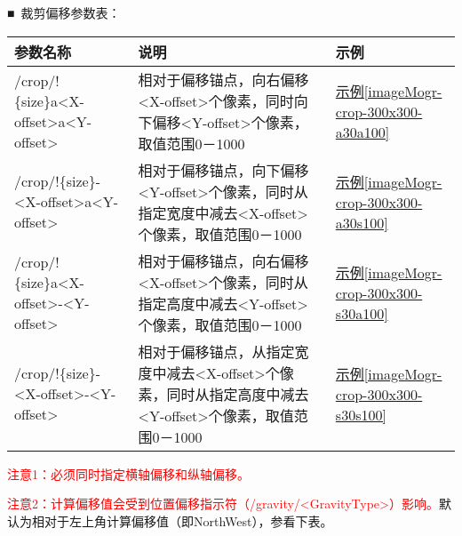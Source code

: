 \documentclass[11pt, oneside]{book}
\newcommand{\qpara}[1]{
\vspace{0.3em}
\noindent
#1\par
\vspace{0.3em}
}
\newcommand{\qtable}[1]{\footnotesize\vspace{0.5em}#1\vspace{0.5em}\normalsize}
\newcommand{\qsample}[1]{\hyperref[#1]{示例\ref*{#1}}}
\begin{document}
\clearpage

\qpara{■\ 裁剪偏移参数表：}
\qtable{
\label{crop-offset-spec}
\begin{tabular}[t]{|l|p{16em}|p{5em}|}
\hline
参数名称 & 说明 & 示例 \\
\hline
/crop/!\{size\}a\textless X-offset\textgreater a\textless Y-offset\textgreater & 相对于偏移锚点，向右偏移\textless X-offset\textgreater 个像素，同时向下偏移\textless Y-offset\textgreater 个像素，取值范围0－1000 & \qsample{imageMogr-crop-300x300-a30a100} \\
\hline
/crop/!\{size\}-\textless X-offset\textgreater a\textless Y-offset\textgreater & 相对于偏移锚点，向下偏移\textless Y-offset\textgreater 个像素，同时从指定宽度中减去\textless X-offset\textgreater 个像素，取值范围0－1000 & \qsample{imageMogr-crop-300x300-a30s100} \\
\hline
/crop/!\{size\}a\textless X-offset\textgreater -\textless Y-offset\textgreater & 相对于偏移锚点，向右偏移\textless X-offset\textgreater 个像素，同时从指定高度中减去\textless Y-offset\textgreater 个像素，取值范围0－1000 & \qsample{imageMogr-crop-300x300-s30a100} \\
\hline
/crop/!\{size\}-\textless X-offset\textgreater -\textless Y-offset\textgreater & 相对于偏移锚点，从指定宽度中减去\textless X-offset\textgreater 个像素，同时从指定高度中减去\textless Y-offset\textgreater 个像素，取值范围0－1000 & \qsample{imageMogr-crop-300x300-s30s100} \\
\hline
\end{tabular}
}

\qpara{\textcolor{red}{注意1：必须同时指定横轴偏移和纵轴偏移。}}
\qpara{\textcolor{red}{注意2：计算偏移值会受到位置偏移指示符（/gravity/\textless GravityType\textgreater）影响。}默认为相对于左上角计算偏移值（即NorthWest），参看下表。}
\end{document}
